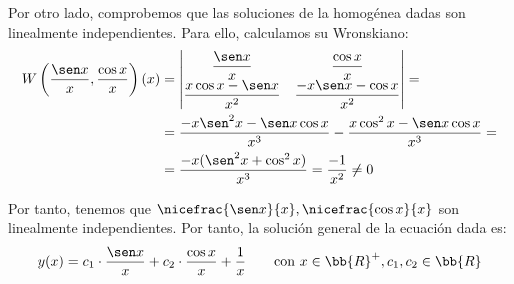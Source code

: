 \begin{ejercicio}
    Por otro lado, comprobemos que las soluciones de la homogénea dadas son linealmente independientes. Para ello, calculamos su Wronskiano:
    \begin{align*}
        W\left(\dfrac{\sen x}{x},\dfrac{\cos x}{x}\right)(x)&=\begin{vmatrix}
            \dfrac{\sen x}{x} & \dfrac{\cos x}{x}\\
            \dfrac{x\cos x-\sen x}{x^2} & \dfrac{-x\sen x-\cos x}{x^2}
        \end{vmatrix}
        =\\&=\dfrac{-x\sen^2x -\sen x\cos x}{x^3}-\dfrac{x\cos^2x-\sen x\cos x}{x^3}
        =\\&=\dfrac{-x(\sen^2x+\cos^2x)}{x^3}
        = \dfrac{-1}{x^2}\neq 0
    \end{align*}

    Por tanto, tenemos que $\nicefrac{\sen x}{x},\nicefrac{\cos x}{x}$ son linealmente independientes. Por tanto, la solución general de la ecuación dada es:
    \begin{equation*}
        y(x)=c_1\cdot\frac{\sen x}{x}+c_2\cdot \dfrac{\cos x}{x}+\dfrac{1}{x}
        \qquad \text{con } x\in \bb{R}^+,c_1,c_2\in \bb{R}
    \end{equation*}
\end{ejercicio}

